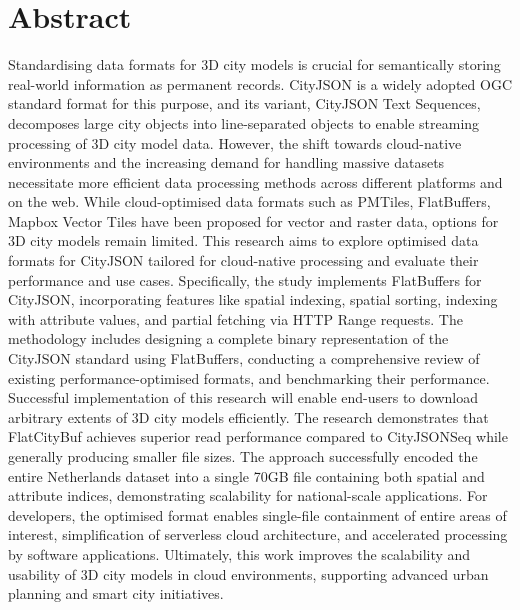 
\chapter*{Abstract}
Standardising data formats for 3D city models is crucial for semantically storing real-world information as permanent records.
CityJSON is a widely adopted OGC standard format for this purpose, and its variant, CityJSON Text Sequences, decomposes large city objects into line-separated objects to enable streaming processing of 3D city model data.
However, the shift towards cloud-native environments and the increasing demand for handling massive datasets necessitate more efficient data processing methods across different platforms and on the web.
While cloud-optimised data formats such as PMTiles, FlatBuffers, Mapbox Vector Tiles have been proposed for vector and raster data, options for 3D city models remain limited.
This research aims to explore optimised data formats for CityJSON tailored for cloud-native processing and evaluate their performance and use cases.
Specifically, the study implements FlatBuffers for CityJSON, incorporating features like spatial indexing, spatial sorting, indexing with attribute values, and partial fetching via HTTP Range requests.
The methodology includes designing a complete binary representation of the CityJSON standard using FlatBuffers, conducting a comprehensive review of existing performance-optimised formats, and benchmarking their performance.
Successful implementation of this research will enable end-users to download arbitrary extents of 3D city models efficiently.
The research demonstrates that FlatCityBuf achieves superior read performance compared to CityJSONSeq while generally producing smaller file sizes.
The approach successfully encoded the entire Netherlands dataset into a single 70GB file containing both spatial and attribute indices, demonstrating scalability for national-scale applications.
For developers, the optimised format enables single-file containment of entire areas of interest, simplification of serverless cloud architecture, and accelerated processing by software applications.
Ultimately, this work improves the scalability and usability of 3D city models in cloud environments, supporting advanced urban planning and smart city initiatives.